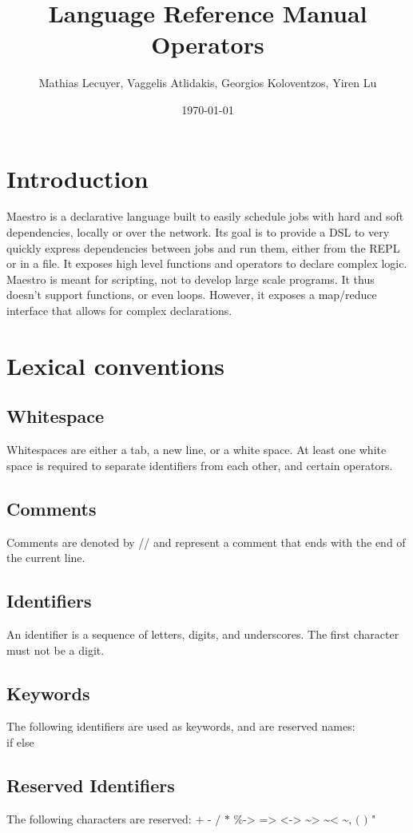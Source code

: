 \documentclass[12pt]{article}
\title{Language Reference Manual Operators}
\author{Mathias Lecuyer, Vaggelis Atlidakis, Georgios Koloventzos, Yiren Lu}
\date{\today}
\begin{document}
\maketitle
\tableofcontents

\section{Introduction}
Maestro is a declarative language built to easily schedule jobs with hard and soft dependencies, locally or over the network.
Its goal is to provide a DSL to very quickly express dependencies between jobs and run them, either from the REPL or in a file.
It exposes high level functions and operators to declare complex logic. Maestro is meant for scripting, not to develop large
scale programs. It thus doesn't support functions, or even loops. However, it exposes a map/reduce interface that allows for
complex declarations.

\section{Lexical conventions}
\subsection{Whitespace}
Whitespaces are either a tab, a new line, or a white space. At least one white space is required to separate identifiers from
each other, and certain operators.

\subsection{Comments}
Comments are denoted by // and represent a comment that ends with the end of the current line.

\subsection{Identifiers}
An identifier is a sequence of letters, digits, and underscores. The first character must not be a digit.

\subsection{Keywords}
The following identifiers are used as keywords, and are reserved names:\\
if else

\subsection{Reserved Identifiers}
The following characters are reserved: $\texttt{+ - / * \% -> => <-> \textasciitilde>
\textasciitilde< \textasciitilde , ( ) "}$
\end{document}
